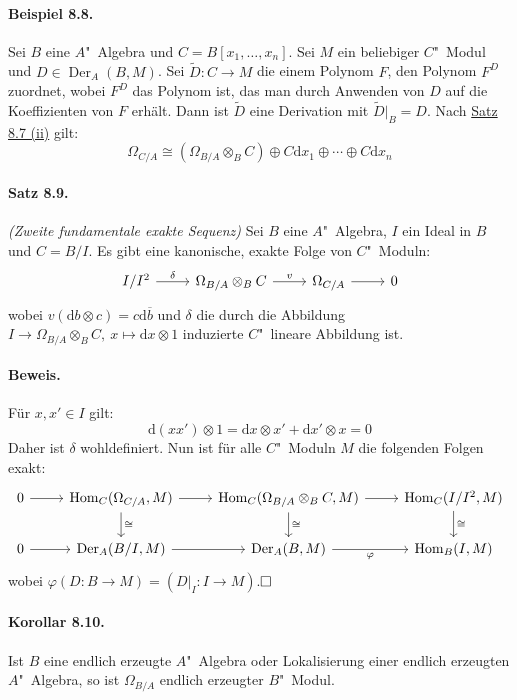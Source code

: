 \documentclass[11pt,b5paper,openany]{memoir}
\def \qed {$\hfill\square$}
\begin{document}
\paragraph{Beispiel 8.8.}\label{8.8} Sei $B$ eine $A$"~Algebra und $C=B[x_1,\ldots,x_n]$. Sei $M$ ein beliebiger $C$"~Modul und $D\in\operatorname{Der}_A(B,M)$. Sei $\widetilde{D}:C\to M$ die einem Polynom $F$, den Polynom $F^D$ zuordnet, wobei $F^D$ das Polynom ist, das man durch Anwenden von $D$ auf die Koeffizienten von $F$ erhält. Dann ist $\widetilde{D}$ eine Derivation mit $\widetilde{D}|_B=D$. Nach \hyperref[8.7]{Satz 8.7 (ii)} gilt:
\[\Omega_{C/A}\cong (\Omega_{B/A}\otimes_BC)\oplus C\mathrm{d}x_1\oplus\cdots\oplus C\mathrm{d}x_n \]

\paragraph{Satz 8.9.}\label{8.9}\textit{(Zweite fundamentale exakte Sequenz)} Sei $B$ eine $A$"~Algebra, $I$ ein Ideal in $B$ und $C=B/I$. Es gibt eine kanonische, exakte Folge von $C$"~Moduln:
\[\begin{tikzcd}
I/I^2\rar["\delta"] & \Omega_{B/A}\otimes_BC\rar["v"] & \Omega_{C/A}\rar & 0
\end{tikzcd} \]
wobei $v(\mathrm{d}b\otimes c)= c\mathrm{d}\overline{b}$ und $\delta$ die durch die Abbildung $I\to\Omega_{B/A}\otimes_BC,\ x\mapsto \mathrm{d}x\otimes 1$ induzierte $C$"~lineare Abbildung ist.

\paragraph{Beweis.} Für $x,x'\in I$ gilt:
\[\mathrm{d}(xx')\otimes 1 = \mathrm{d}x\otimes x' + \mathrm{d}x'\otimes x =0 \]
Daher ist $\delta$ wohldefiniert. Nun ist für alle $C$"~Moduln $M$ die folgenden Folgen exakt:
\[\begin{tikzcd}
0 \rar & \operatorname{Hom}_C(\Omega_{C/A},M)\dar["\cong"] \rar & \operatorname{Hom}_C(\Omega_{B/A}\otimes_BC,M)\dar["\cong"] \rar & \operatorname{Hom}_C(I/I^2,M)\dar["\cong"]\\
0 \rar & \operatorname{Der}_A(B/I,M) \rar & \operatorname{Der}_A(B,M) \rar["\varphi"'] & \operatorname{Hom}_B(I,M)
\end{tikzcd} \]
wobei $\varphi(D:B\to M) = (D|_I:I\to M)$.\qed

\paragraph{Korollar 8.10.}\label{8.10} Ist $B$ eine endlich erzeugte $A$"~Algebra oder Lokalisierung einer endlich erzeugten $A$"~Algebra, so ist $\Omega_{B/A}$ endlich erzeugter $B$"~Modul.
\end{document}
